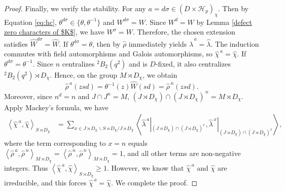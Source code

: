 \documentclass[11pt,a4paper]{article}
\numberwithin{equation}{section}
\theoremstyle{definition}
\theoremstyle{remark}
\newcommand{\HH}{\mathcal H}
\begin{document}
\begin{proof}
Finally, we verify the stability. For any
$a=d\sigma\in(D\times\HH_p)_\chi$. Then by Equation \eqref{eq:hc},  $\theta^{d\sigma}\in\{\theta,\theta^{-1}\}$
and $W^{d\sigma}=W$. Since \(W^d=W\) by Lemma \ref{defect zero characters of $K$}, we have \(W^\sigma=W\). Therefore, the chosen extension satisfies $\widehat W^{d\sigma}=\widehat W$. If $\theta^{d\sigma}=\theta$, 
then by $\widehat \rho$ immediately yields
$\widehat\lambda^{\,a}=\widehat\lambda$. The induction commutes with field automorphisms and  Galois automorphisms, 
so $\widehat\chi^{\,a}=\widehat\chi$. If
$\theta^{d\sigma}=\theta^{-1}$. Since \(n\) centralizes \({ }^2B_2(q^2)\) and is $D$-fixed, it also centralizes \({}^2B_2(q^2)\rtimes D_\chi\). Hence, on the group \(M\rtimes D_\chi\), we obtain
\[
\widehat\rho^{\,a}(zsd)=
\theta^{-1}(z)\widehat W(sd)=
\widehat\rho^{\,n}(zsd).
\]
Moreover, since $n^d=n$ and $J\cap J^n=M$, 
$(J\rtimes D_\chi)\cap(J\rtimes D_\chi)^{\,n}=
M\rtimes D_\chi$. Apply Mackey's formula, we have
\[
\begin{aligned}
\left\langle
\widehat\chi^{\,a},\widehat\chi
\right\rangle_{S\rtimes D_\chi} &=
\sum_{x\in J\rtimes D_\chi\backslash S\rtimes D_\chi/J\rtimes D_\chi}
\left\langle
\widehat\lambda^{\,a}|_{(J\rtimes D_\chi)\cap (J\rtimes D_\chi)^x},\widehat\lambda^{\,x}|_{(J\rtimes D_\chi)\cap (J\rtimes D_\chi)^x}
\right\rangle,
\end{aligned}
\]
where the term corresponding to \(x=n\) equals
$\left\langle
\widehat\rho^{\,a},\widehat\rho^{\,n}
\right\rangle_{M\rtimes D_\chi}=
\left\langle
\widehat\rho^{\,n},\widehat\rho^{\,n}
\right\rangle_{M\rtimes D_\chi}=1$, and all other terms are non-negative integers. Thus 
$\left\langle
\widehat\chi^{\,a},\widehat\chi
\right\rangle_{S\rtimes D_\chi}\geq1$.
However, we know that $\widehat\chi^{\,a}$ and $\widehat\chi$
are irreducible, and this forces  $\widehat\chi^{\,a}=\widehat\chi$. We complete the proof.
\end{proof}
\end{document}
